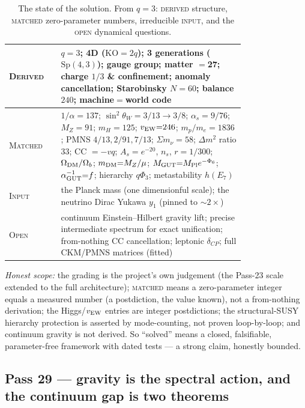 \documentclass[11pt]{article}
\begin{document}
\begin{table}[ht]\centering\small
\caption{The state of the solution. From $q=3$: \textsc{derived} structure, \textsc{matched}
zero-parameter numbers, irreducible \textsc{input}, and the \textsc{open} dynamical questions.}
\label{tab:state}
\begin{tabular}{l p{0.78\linewidth}}
\toprule
\textsc{Derived} & $q=3$; 4D ($\mathrm{KO}{=}2q$); 3 generations ($\mathrm{Sp}(4,3)$); gauge group;
matter $={}$\textbf{27}; charge $1/3$ \& confinement; anomaly cancellation; Starobinsky $N{=}60$;
balance $240$; machine$=$world code\\ \midrule
\textsc{Matched} & $1/\alpha{=}137$; $\sin^2\theta_W{=}3/13{\to}3/8$; $\alpha_s{=}9/76$; $M_Z{=}91$;
$m_H{=}125$; $v_{\rm EW}{=}246$; $m_p/m_e{=}1836$; PMNS $4/13,2/91,7/13$; $\Sigma m_\nu{=}58$;
$\Delta m^2$ ratio $33$; CC $=-vq$; $A_s{=}e^{-20}$, $n_s$, $r{=}1/300$; $\Omega_{\rm DM}/\Omega_b$;
$m_{\rm DM}{=}M_Z/\mu$; $M_{\rm GUT}{=}M_{\rm Pl}e^{-\Phi_6}$; $\alpha_{\rm GUT}^{-1}{=}f$;
hierarchy $q\Phi_3$; metastability $h(E_7)$\\ \midrule
\textsc{Input} & the Planck mass (one dimensionful scale); the neutrino Dirac Yukawa $y_1$ (pinned
to ${\sim}2\times$)\\ \midrule
\textsc{Open} & continuum Einstein--Hilbert gravity lift; precise intermediate spectrum for exact
unification; from-nothing CC cancellation; leptonic $\delta_{CP}$; full CKM/PMNS matrices (fitted)\\
\bottomrule
\end{tabular}
\end{table}

\emph{Honest scope:} the grading is the project's own judgement (the Pass-23 scale extended to the
full architecture); \textsc{matched} means a zero-parameter integer equals a measured number (a
postdiction, the value known), not a from-nothing derivation; the Higgs/$v_{\rm EW}$ entries are
integer postdictions; the structural-SUSY hierarchy protection is asserted by mode-counting, not
proven loop-by-loop; and continuum gravity is not derived. So ``solved'' means a closed, falsifiable,
parameter-free framework with dated tests --- a strong claim, honestly bounded.

\subsection{Pass 29 --- gravity is the spectral action, and the continuum gap is two theorems}
\label{sec:capstone-twentynine}
\end{document}

